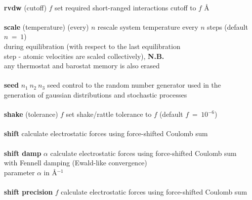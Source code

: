 \begin{tabbing}
\>                                              \> \\
\> {\bf rvdw} (cutoff) $f$                      \> set required short-ranged interactions cutoff to $f$ \AA \\
\>                                              \> \\
\> {\bf scale} (temperature) (every) $n$        \> rescale system temperature every $n$ steps (default $n~=~1$) \\
\>                                              \> during equilibration (with respect to the last equilibration \\
\>                                              \> step - atomic velocities are scaled collectively), {\bf N.B.} \\
\>                                              \> any thermostat and barostat memory is also erased \\
\>                                              \> \\
\> {\bf seed} $n_{1}~n_{2}~n_{3}$               \> seed control to the random number generator used in the \\
\>                                              \> generation of gaussian distributions and stochastic processes \\
\>                                              \> \\
\> {\bf shake} (tolerance) $f$                  \> set shake/rattle tolerance to $f$ (default $f~=~10^{-6}$) \\
\>                                              \> \\
\> {\bf shift}                                  \> calculate electrostatic forces using force-shifted Coulomb sum \\
\>                                              \> \\
\> {\bf shift damp} $\alpha$                    \> calculate electrostatic forces using force-shifted Coulomb sum \\
\>                                              \> with Fennell \cite{fennell-06a} damping (Ewald-like convergence) \\
\>                                              \> parameter $\alpha$ in \AA$^{-1}$ \\
\>                                              \> \\
\> {\bf shift precision} $f$                    \> calculate electrostatic forces using force-shifted Coulomb sum \\

\end{tabbing}
